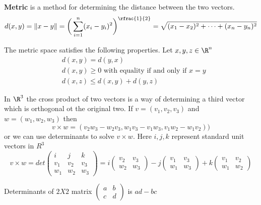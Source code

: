 \documentclass[11pt]{article}
\begin{document}
\begin{defn}
  \label{metric}
  \textbf{Metric} is a method for determining the distance between the two vectors.
  \[
    d(x,y) = \| x-y\| = \bigg( \sum_{i=1}^n (x_i - y_i)^2 \bigg)^{\rfrac{1}{2}} = \sqrt{(x_1-x_2)^2 + \dots + (x_n-y_n)^2}
  \]

  The metric space satisfies the following properties. Let $x,y,z\in \R^n$
  \begin{align}
      &d(x,y) = d(y,x) \tag{Symmetry} \\
      &d(x,y)\geq 0 \text{ with equality if and only if } x=y \tag{Non-degeneracy} \\
      &d(x,z)\leq d(x,y) + d(y,z) \tag{Triangle Inequality} \label{Metric triangle inequality}
  \end{align}

\end{defn}


\begin{defn}
  \label{cross product}
  In $\R^3$ the cross product of two vectors is a way of determining a third vector which is orthogonal ot the original two. If $v=(v_1, v_2, v_3)$ and $w=(w_1, w_2, w_3)$ then
  \[
    v \times w = (v_2w_3 - w_2v_3, w_1v_3 - v_1w_3, v_1w_2 - w_1v_2))
  \]
  or we can use determinants to solve $v\times w$. Here $i,j,k$ represent standard unit vectors in $R^3$
  \[
    v\times w = det
      \begin{pmatrix}
        i & j & k \\
        v_1 & v_2 & v_3 \\
        w_1 & w_2 & w_3
      \end{pmatrix}
    = i\begin{pmatrix}
        v_2 & v_3 \\
        w_2 & w_3
      \end{pmatrix}
    - j\begin{pmatrix}
        v_1 & v_3 \\
        w_1 & w_3
      \end{pmatrix}
    + k\begin{pmatrix}
        v_1 & v_2\\
        w_1 & w_2
      \end{pmatrix}
  \]

  \begin{note}
    Determinants of $2X2$ matrix $\begin{pmatrix} a& b\\c& d\end{pmatrix}$ is $ad -bc$
  \end{note}
\end{defn}
\end{document}
